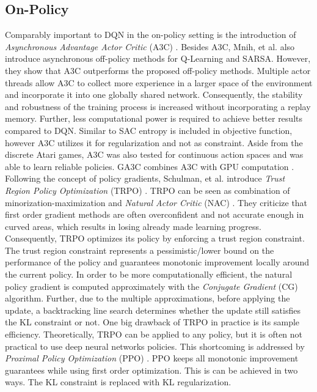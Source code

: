     \subsection{On-Policy}
    \label{sec:on-policy}
	Comparably important to DQN in the on-policy setting is the introduction of \textit{Asynchronous Advantage Actor Critic} (A3C) \cite{Mnih2016}.
   	Besides A3C, Mnih, et al. also introduce asynchronous off-policy methods for Q-Learning and SARSA.
   	However, they show that A3C outperforms the proposed off-policy methods.
   	Multiple actor threads allow A3C to collect more experience in a larger space of the environment and incorporate it into one globally shared network.
   	Consequently, the stability and robustness of the training process is increased without incorporating a replay memory. 
	Further, less computational power is required to achieve better results compared to DQN.
	Similar to SAC entropy is included in objective function, however A3C utilizes it for regularization and not as constraint.
	Aside from the discrete Atari games, A3C was also tested for continuous action spaces and was able to learn reliable policies. 
	GA3C combines A3C with GPU computation \cite{Babaeizadeh2017}.
    Following the concept of policy gradients, Schulman, et al. introduce \textit{Trust Region Policy Optimization} (TRPO) \cite{Schulman2015}.
    TRPO can be seen as combination of minorization-maximization \cite{Hunter2004} and \textit{Natural Actor Critic} (NAC) \cite{Peters2008}.
    They criticize that first order gradient methods are often overconfident and not accurate enough in curved areas, which results in losing already made learning progress. 
    Consequently, TRPO optimizes its policy by enforcing a trust region constraint. 
    The trust region constraint represents a pessimistic/lower bound on the performance of the policy and guarantees monotonic improvement locally around the current policy.	
    In order to be more computationally efficient, the natural policy gradient \cite{Kakade2001} is computed approximately with the \textit{Conjugate Gradient} (CG) algorithm.
    Further, due to the multiple approximations, before applying the update, a backtracking line search determines whether the update still satisfies the KL constraint or not. 
    One big drawback of TRPO in practice is its sample efficiency. 
    Theoretically, TRPO can be applied to any policy, but it is often not practical to use deep neural networks policies.
    This shortcoming is addressed by \textit{Proximal Policy Optimization} (PPO) \cite{Schulman2017}.
    PPO keeps all monotonic improvement guarantees while using first order optimization. This is can be achieved in two ways. The KL constraint is replaced with KL regularization.
